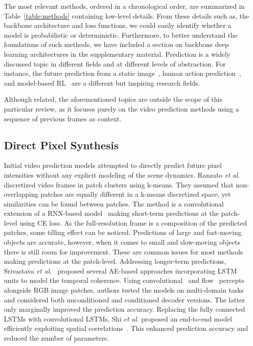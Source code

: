 The most relevant methods, ordered in a chronological order, are summarized in Table~\ref{table:methods} containing low-level details. From these details such as, the backbone architecture and loss functions, we could easily identify whether a model is probabilistic or deterministic. Furthermore, to better understand the foundations of such methods, we have included a section on backbone deep learning architectures in the supplementary material.
Prediction is a widely discussed topic in different fields and at different levels of abstraction. For instance, the future prediction from a static image~\cite{Vondrick2016a,Jayaraman2016,Walker2016,Chen2017a,Hao2018,Ye2019}, human action prediction~\cite{Kong2018}, and model-based \ac{RL}~\cite{Hafner2019,Hafner2020,Kaiser2020} are a different but inspiring research fields.

Although related, the aforementioned topics are outside the scope of this particular review, as it focuses purely on the video prediction methods using a sequence of previous frames as context.

\subsection{Direct Pixel Synthesis}
\label{subsec:m_raw}
Initial video prediction models attempted to directly predict future pixel intensities without any explicit modeling of the scene dynamics. Ranzato \textit{et al.}~\cite{Ranzato2014} discretized video frames in patch clusters using k-means. They assumed that non-overlapping patches are equally different in a k-means discretized space, yet similarities can be found between patches. The method is a convolutional extension of a \ac{RNN}-based model~\cite{Mikolov2010} making short-term predictions at the patch-level using \ac{CE} loss. As the full-resolution frame is a composition of the predicted patches, some tilling effect can be noticed. Predictions of large and fast-moving objects are accurate, however, when it comes to small and slow-moving objects there is still room for improvement. These are common issues for most methods making predictions at the patch-level. Addressing longer-term predictions, Srivastava \textit{et al.}~\cite{Srivastava2015} proposed several \ac{AE}-based approaches incorporating \ac{LSTM} units to model the temporal coherence. Using convolutional~\cite{Simonyan2015} and flow~\cite{Brox2004} percepts alongside RGB image patches, authors tested the models on multi-domain tasks and considered both unconditioned and conditioned decoder versions. The latter only marginally improved the prediction accuracy. Replacing the fully connected \acp{LSTM} with convolutional \acp{LSTM}, Shi \textit{et al.} proposed an end-to-end model efficiently exploiting spatial correlations~\cite{Shi2015}. This enhanced prediction accuracy and reduced the number of parameters.

